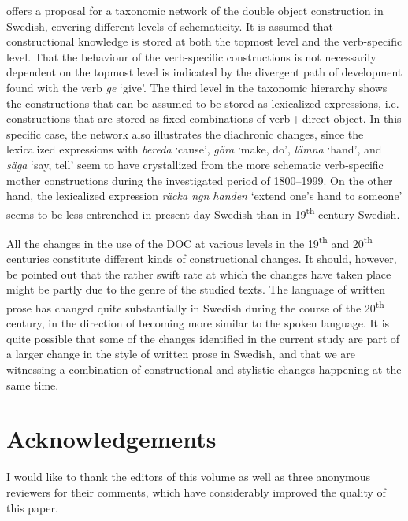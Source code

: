 \documentclass[output=paper]{langscibook}
\begin{document}
\begin{sloppypar}
 offers a proposal for a taxonomic network of the double object construction in Swedish, covering different levels of schematicity. It is assumed that constructional knowledge is stored at both the topmost level and the verb-specific level. That the behaviour of the verb-specific constructions is not necessarily dependent on the topmost level is indicated by the divergent path of development found with the verb \textit{ge} ‘give’. The third level in the taxonomic hierarchy shows the constructions that can be assumed to be stored as lexicalized expressions, i.e. constructions that are stored as fixed combinations of verb\,+\,direct object. In this specific case, the network also illustrates the diachronic changes, since the lexicalized expressions with \textit{bereda} ‘cause’, \textit{göra} ‘make, do’, \textit{lämna} ‘hand’, and \textit{säga} ‘say, tell’ seem to have crystallized from the more schematic verb-specific mother constructions during the investigated period of 1800–1999. On the other hand, the lexicalized expression \textit{räcka ngn handen} ‘extend one's hand to someone’ seems to be less entrenched in present-day Swedish than in 19\textsuperscript{th} century Swedish.
\end{sloppypar}


All the changes in the use of the DOC at various levels in the 19\textsuperscript{th} and 20\textsuperscript{th} centuries constitute different kinds of constructional changes. It should, however, be pointed out that the rather swift rate at which the changes have taken place might be partly due to the genre of the studied texts. The language of written prose has changed quite substantially in Swedish during the course of the 20\textsuperscript{th} century, in the direction of becoming more similar to the spoken language. It is quite possible that some of the changes identified in the current study are part of a larger change in the style of written prose in Swedish, and that we are witnessing a combination of constructional and stylistic changes happening at the same time.


\section*{Acknowledgements}


I would like to thank the editors of this volume as well as three anonymous reviewers for their comments, which have considerably improved the quality of this paper.
\end{document}

